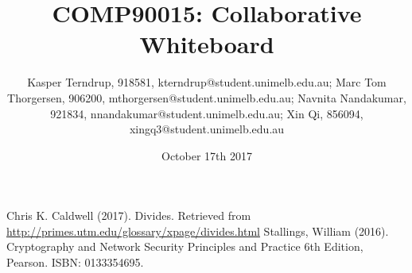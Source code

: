 \documentclass[10pt,a4paper,article,oneside]{memoir}
\title{COMP90015: Collaborative Whiteboard}
\author{Kasper Terndrup, 918581, kterndrup@student.unimelb.edu.au;
Marc Tom Thorgersen, 906200, mthorgersen@student.unimelb.edu.au;
Navnita Nandakumar, 921834, nnandakumar@student.unimelb.edu.au;
Xin Qi, 856094, xingq3@student.unimelb.edu.au}
\date{October 17th 2017}
\begin{document}
\maketitle








\newpage

\begin{thebibliography}{99}
 Chris K. Caldwell (2017). Divides. Retrieved from \url{http://primes.utm.edu/glossary/xpage/divides.html}
 Stallings, William (2016). Cryptography and Network Security Principles and Practice 6th Edition, Pearson. ISBN: 0133354695.
\end{thebibliography}
\end{document}

